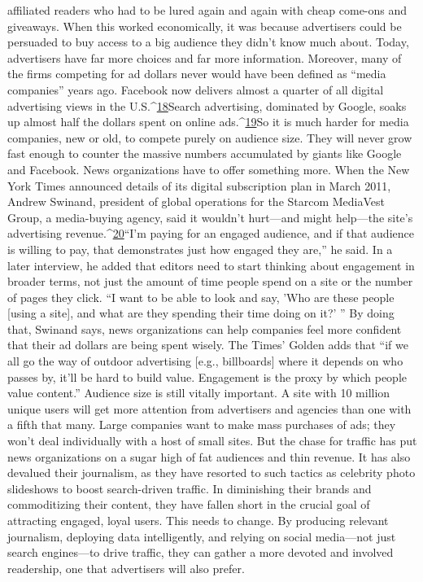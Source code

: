affiliated readers who had to be lured again and again with cheap come-ons and
giveaways. When this worked economically, it was because advertisers could be
persuaded to buy access to a big audience they didn't know much about. Today,
advertisers have far more choices and far more information. Moreover, many of
the firms competing for ad dollars never would have been defined as ``media
companies'' years ago. Facebook now delivers almost a quarter of all digital advertising
views in the U.S.^{\href{#endnotes-chapter-2}{18}}Search advertising, dominated by Google, soaks up
almost half the dollars spent on online ads.^{\href{#endnotes-chapter-2}{19}}So it is much harder for media companies, new or old, to compete purely on
audience size. They will never grow fast enough to counter the massive numbers
accumulated by giants like Google and Facebook. News organizations have to
offer something more.
When the New York Times announced details of its digital subscription plan
in March 2011, Andrew Swinand, president of global operations for the Starcom
MediaVest Group, a media-buying agency, said it wouldn't hurt—and might
help—the site's advertising revenue.^{\href{#endnotes-chapter-2}{20}}``I'm paying for an engaged audience, and
if that audience is willing to pay, that demonstrates just how engaged they are,''
he said. In a later interview, he added that editors need to start thinking about
engagement in broader terms, not just the amount of time people spend on a
site or the number of pages they click. ``I want to be able to look and say, 'Who
are these people [using a site], and what are they spending their time doing on
it?' '' By doing that, Swinand says, news organizations can help companies feel
more confident that their ad dollars are being spent wisely. The Times' Golden
adds that ``if we all go the way of outdoor advertising [e.g., billboards] where it
depends on who passes by, it'll be hard to build value. Engagement is the proxy
by which people value content.''
Audience size is still vitally important. A site with 10 million unique users will
get more attention from advertisers and agencies than one with a fifth that many.
Large companies want to make mass purchases of ads; they won't deal individually
with a host of small sites. But the chase for traffic has put news organizations
on a sugar high of fat audiences and thin revenue. It has also devalued their
journalism, as they have resorted to such tactics as celebrity photo slideshows to
boost search-driven traffic. In diminishing their brands and commoditizing their
content, they have fallen short in the crucial goal of attracting engaged, loyal
users. This needs to change. By producing relevant journalism, deploying data
intelligently, and relying on social media—not just search engines—to drive traffic,
they can gather a more devoted and involved readership, one that advertisers
will also prefer.

